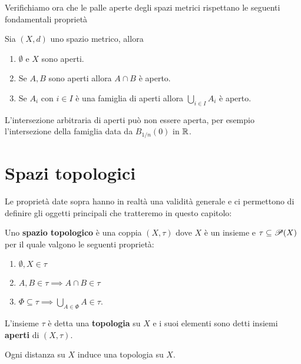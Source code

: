 \begin{multicols*}{2}
\vspace{0.5cm}

\noindent Verifichiamo ora che le palle aperte degli spazi metrici rispettano le seguenti fondamentali proprietà
\begin{proposition}
Sia $(X,d)$ uno spazio metrico, allora
\begin{enumerate}[noitemsep]
\item $\emptyset$ e $X$ sono aperti.
\item Se $A,B$ sono aperti allora $A\cap B$ è aperto.
\item Se $A_i$ con $i\in I$ è una famiglia di aperti allora $\displaystyle \bigcup_{i\in I}A_i$ è aperto.
\end{enumerate}
\end{proposition}
\begin{remark}
L'intersezione arbitraria di aperti può non essere aperta, per esempio l'intersezione della famiglia data da $B_{1/n}(0)$ in $\mathbb{R}$.
\end{remark}
\section{Spazi topologici}
Le proprietà date sopra hanno in realtà una validità generale e ci permettono di definire gli oggetti principali che tratteremo in questo capitolo:
\begin{definition}
Uno \textbf{spazio topologico} è una coppia $(X,\tau)$ dove $X$ è un insieme e $\tau\subseteq \mathscr{P}(X)$ per il quale valgono le seguenti proprietà:
\begin{enumerate}[noitemsep]
\item $\emptyset,X\in\tau$
\item $A,B\in\tau\implies A\cap B\in \tau$
\item $\Phi\subseteq \tau\implies \bigcup_{A\in\Phi}A\in \tau$.
\end{enumerate}
L'insieme $\tau$ è detta una \textbf{topologia} su $X$ e i suoi elementi sono detti insiemi \textbf{aperti} di $(X,\tau)$.
\end{definition}
\begin{remark}
Ogni distanza su $X$ induce una topologia su $X$.
\end{remark}


\end{multicols*}
